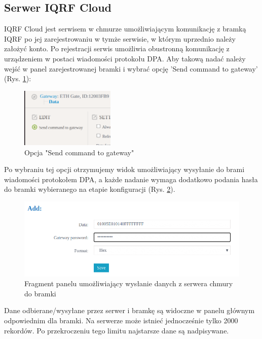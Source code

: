 \subsection{Serwer IQRF Cloud}

IQRF Cloud jest serwisem w chmurze umożliwiającym komunikację z bramką IQRF po jej zarejestrowaniu w tymże serwisie, w którym uprzednio należy
założyć konto. Po rejestracji serwis umożliwia obustronną komunikację z urządzeniem w postaci wiadomości protokołu DPA. Aby takową nadać należy 
wejść w panel zarejestrowanej bramki i wybrać opcję 'Send command to gateway' (Rys. \ref{send-comm}):

\begin{figure}[H]
    \centering
    \includegraphics[width=0.4\textwidth]{zdj/send-command-to-gw.png}
    \caption{Opcja "Send command to gateway"}
    \label{send-comm}
\end{figure}

Po wybraniu tej opcji otrzymujemy widok umożliwiający wysyłanie do brami wiadomości protokołem DPA, a każde nadanie wymaga dodatkowo podania
hasła do bramki wybieranego na etapie konfiguracji (Rys. \ref{send-data}).

\begin{figure}[H]
    \includegraphics[width=\textwidth]{zdj/cloud-send-message.png}
    \caption{Fragment panelu umożliwiający wysłanie danych z serwera chmury do bramki}
    \label{send-data}
\end{figure}

Dane odbierane/wysyłane przez serwer i bramkę są widoczne w panelu głównym odpowiednim dla bramki. Na serwerze może istnieć jednocześnie tylko 2000
rekordów. Po przekroczeniu tego limitu najstarsze dane są nadpisywane.

